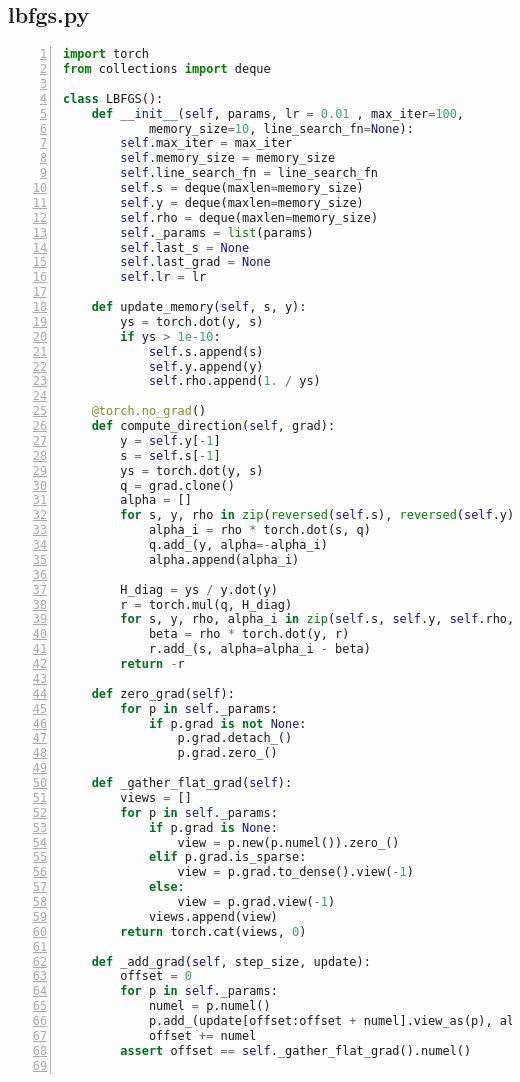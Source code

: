 \subsection*{lbfgs.py}
\begin{lstlisting}[language=python,numbers=left]
import torch
from collections import deque

class LBFGS():
    def __init__(self, params, lr = 0.01 , max_iter=100, 
            memory_size=10, line_search_fn=None):
        self.max_iter = max_iter
        self.memory_size = memory_size
        self.line_search_fn = line_search_fn
        self.s = deque(maxlen=memory_size)
        self.y = deque(maxlen=memory_size)
        self.rho = deque(maxlen=memory_size)
        self._params = list(params)
        self.last_s = None
        self.last_grad = None
        self.lr = lr
    
    def update_memory(self, s, y):
        ys = torch.dot(y, s)
        if ys > 1e-10:
            self.s.append(s)
            self.y.append(y)
            self.rho.append(1. / ys)
    
    @torch.no_grad()
    def compute_direction(self, grad):
        y = self.y[-1]
        s = self.s[-1]
        ys = torch.dot(y, s)
        q = grad.clone()
        alpha = []
        for s, y, rho in zip(reversed(self.s), reversed(self.y), reversed(self.rho)):
            alpha_i = rho * torch.dot(s, q)
            q.add_(y, alpha=-alpha_i)
            alpha.append(alpha_i)

        H_diag = ys / y.dot(y)
        r = torch.mul(q, H_diag)
        for s, y, rho, alpha_i in zip(self.s, self.y, self.rho, reversed(alpha)):
            beta = rho * torch.dot(y, r)
            r.add_(s, alpha=alpha_i - beta)
        return -r
    
    def zero_grad(self):
        for p in self._params:
            if p.grad is not None:
                p.grad.detach_()
                p.grad.zero_()

    def _gather_flat_grad(self):
        views = []
        for p in self._params:
            if p.grad is None:
                view = p.new(p.numel()).zero_()
            elif p.grad.is_sparse:
                view = p.grad.to_dense().view(-1)
            else:
                view = p.grad.view(-1)
            views.append(view)
        return torch.cat(views, 0)
    
    def _add_grad(self, step_size, update):
        offset = 0
        for p in self._params:
            numel = p.numel()
            p.add_(update[offset:offset + numel].view_as(p), alpha=step_size)
            offset += numel
        assert offset == self._gather_flat_grad().numel()


\end{lstlisting}

